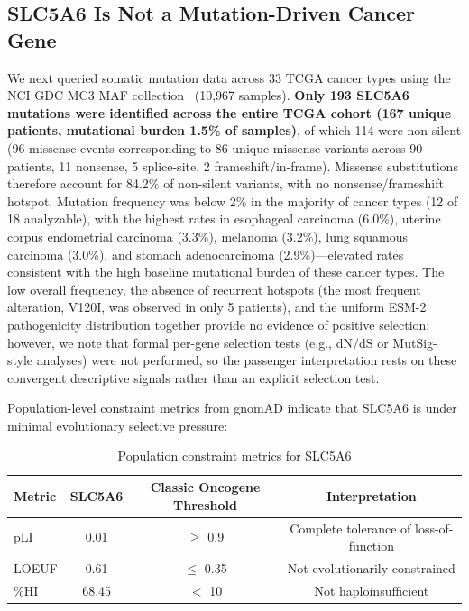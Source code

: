 \documentclass[pdflatex,sn-nature]{sn-jnl}
\begin{document}
\subsection*{SLC5A6 Is Not a Mutation-Driven Cancer Gene}

We next queried somatic mutation data across 33 TCGA cancer types using the NCI GDC MC3 MAF collection~\cite{ellrott2018} (10,967 samples). \textbf{Only 193 SLC5A6 mutations were identified across the entire TCGA cohort (167 unique patients, mutational burden 1.5\% of samples)}, of which 114 were non-silent (96 missense events corresponding to 86 unique missense variants across 90 patients, 11 nonsense, 5 splice-site, 2 frameshift/in-frame). Missense substitutions therefore account for 84.2\% of non-silent variants, with no nonsense/frameshift hotspot. Mutation frequency was below 2\% in the majority of cancer types (12 of 18 analyzable), with the highest rates in esophageal carcinoma (6.0\%), uterine corpus endometrial carcinoma (3.3\%), melanoma (3.2\%), lung squamous carcinoma (3.0\%), and stomach adenocarcinoma (2.9\%)---elevated rates consistent with the high baseline mutational burden of these cancer types. The low overall frequency, the absence of recurrent hotspots (the most frequent alteration, V120I, was observed in only 5 patients), and the uniform ESM-2 pathogenicity distribution together provide no evidence of positive selection; however, we note that formal per-gene selection tests (e.g., dN/dS or MutSig-style analyses) were not performed, so the passenger interpretation rests on these convergent descriptive signals rather than an explicit selection test.

Population-level constraint metrics from gnomAD indicate that SLC5A6 is under minimal evolutionary selective pressure:

\begin{table}[t]
\centering
\caption{Population constraint metrics for SLC5A6}
\label{tab:constraint}
\begin{tabular}{lccc}
\toprule
Metric & SLC5A6 & Classic Oncogene Threshold & Interpretation \\
\midrule
pLI   & 0.01  & $\ge$ 0.9  & Complete tolerance of loss-of-function \\
LOEUF & 0.61  & $\le$ 0.35 & Not evolutionarily constrained \\
\%HI  & 68.45 & $<$ 10     & Not haploinsufficient \\
\bottomrule
\end{tabular}
\end{table}
\end{document}
